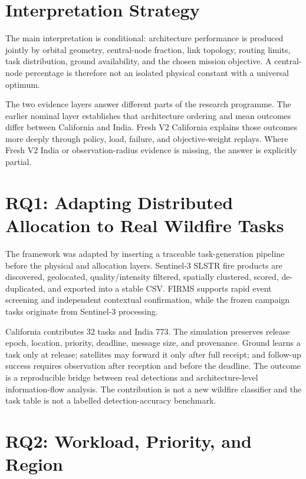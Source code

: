\section{Interpretation Strategy}

The main interpretation is conditional: architecture performance is produced jointly by orbital geometry, central-node fraction, link topology, routing limits, task distribution, ground availability, and the chosen mission objective. A central-node percentage is therefore not an isolated physical constant with a universal optimum.

The two evidence layers answer different parts of the research programme. The earlier nominal layer establishes that architecture ordering and mean outcomes differ between California and India. Fresh V2 California explains those outcomes more deeply through policy, load, failure, and objective-weight replays. Where Fresh V2 India or observation-radius evidence is missing, the answer is explicitly partial.

\section{RQ1: Adapting Distributed Allocation to Real Wildfire Tasks}

The framework was adapted by inserting a traceable task-generation pipeline before the physical and allocation layers. Sentinel-3 SLSTR fire products are discovered, geolocated, quality/intensity filtered, spatially clustered, scored, de-duplicated, and exported into a stable CSV. FIRMS supports rapid event screening and independent contextual confirmation, while the frozen campaign tasks originate from Sentinel-3 processing.

California contributes 32 tasks and India 773. The simulation preserves release epoch, location, priority, deadline, message size, and provenance. Ground learns a task only at release; satellites may forward it only after full receipt; and follow-up success requires observation after reception and before the deadline. The outcome is a reproducible bridge between real detections and architecture-level information-flow analysis. The contribution is not a new wildfire classifier and the task table is not a labelled detection-accuracy benchmark.

\section{RQ2: Workload, Priority, and Region}


